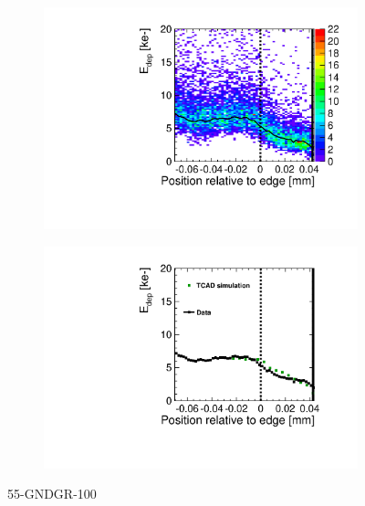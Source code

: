 \begin{figure}[htbp]
  \centering
  \begin{subfigure}[b]{0.5\textwidth}
    \includegraphics[width=\textwidth]{figures/ActiveEdge/TCAD_data_Edep_55_GNDGR_100.pdf}
    \caption{}
  \end{subfigure}\hfill
  \begin{subfigure}[b]{0.5\textwidth}
    \includegraphics[width=\textwidth]{figures/ActiveEdge/TCAD_data_55_GNDGR_100.pdf}
    \caption{}
  \end{subfigure}
  \caption{55-GNDGR-100}
  \label{fig:TCAD_vs_data_55_GNDGR_100}
\end{figure}




